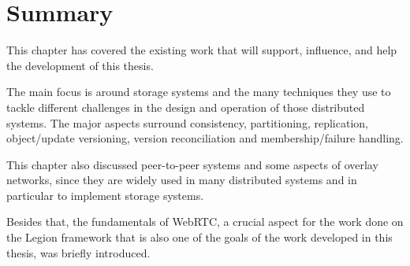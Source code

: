 \section{Summary}
\label{sec:summary}
This chapter has covered the existing work that will support, influence, and help the development of this thesis.\par
	The main focus is around storage systems and the many techniques they use to tackle different challenges in the design and operation of those distributed systems. The major aspects surround consistency, partitioning, replication, object/update versioning, version reconciliation and membership/failure handling.\par
	This chapter also discussed peer-to-peer systems and some aspects of overlay networks, since they are widely used in many distributed systems and in particular to implement storage systems.\par
	Besides that, the fundamentals of WebRTC, a crucial aspect for the work done on the Legion framework that is also one of the goals of the work developed in this thesis, was briefly introduced.